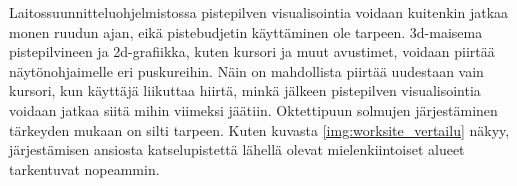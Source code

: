 Laitossuunnitteluohjelmistossa pistepilven visualisointia voidaan kuitenkin jatkaa monen ruudun ajan, eikä pistebudjetin käyttäminen ole tarpeen. 3d-maisema pistepilvineen ja 2d-grafiikka, kuten kursori ja muut avustimet, voidaan piirtää näytönohjaimelle eri puskureihin. Näin on mahdollista piirtää uudestaan vain kursori, kun käyttäjä liikuttaa hiirtä, minkä jälkeen pistepilven visualisointia voidaan jatkaa siitä mihin viimeksi jäätiin. Oktettipuun solmujen järjestäminen tärkeyden mukaan on silti tarpeen. Kuten kuvasta \ref{img:worksite_vertailu} näkyy, järjestämisen ansiosta katselupistettä lähellä olevat mielenkiintoiset alueet tarkentuvat nopeammin.



